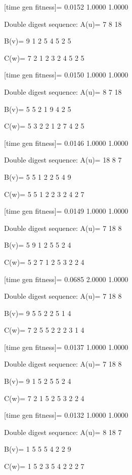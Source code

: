 [time gen fitness]=
    0.0152    1.0000    1.0000

Double digest sequence:
A(u)=
     7     8    18

B(v)=
     9     1     2     5     4     5     2     5

C(w)=
     7     2     1     2     3     2     4     5     2     5

[time gen fitness]=
    0.0150    1.0000    1.0000

Double digest sequence:
A(u)=
     8     7    18

B(v)=
     5     5     2     1     9     4     2     5

C(w)=
     5     3     2     2     1     2     7     4     2     5

[time gen fitness]=
    0.0146    1.0000    1.0000

Double digest sequence:
A(u)=
    18     8     7

B(v)=
     5     5     1     2     2     5     4     9

C(w)=
     5     5     1     2     2     3     2     4     2     7

[time gen fitness]=
    0.0149    1.0000    1.0000

Double digest sequence:
A(u)=
     7    18     8

B(v)=
     5     9     1     2     5     5     2     4

C(w)=
     5     2     7     1     2     5     3     2     2     4

[time gen fitness]=
    0.0685    2.0000    1.0000

Double digest sequence:
A(u)=
     7    18     8

B(v)=
     9     5     5     2     2     5     1     4

C(w)=
     7     2     5     5     2     2     2     3     1     4

[time gen fitness]=
    0.0137    1.0000    1.0000

Double digest sequence:
A(u)=
     7    18     8

B(v)=
     9     1     5     2     5     5     2     4

C(w)=
     7     2     1     5     2     5     3     2     2     4

[time gen fitness]=
    0.0132    1.0000    1.0000

Double digest sequence:
A(u)=
     8    18     7

B(v)=
     1     5     5     5     4     2     2     9

C(w)=
     1     5     2     3     5     4     2     2     2     7


